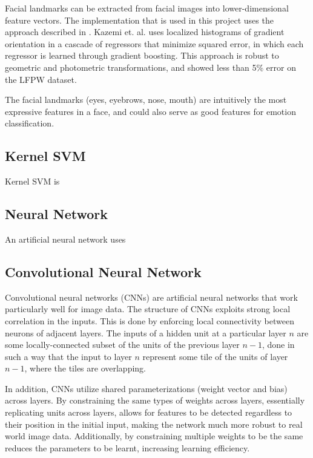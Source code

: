 \documentclass[11pt, twocolumn, twoside]{article}
\begin{document}
Facial landmarks can be extracted from facial images into lower-dimensional feature
vectors. The implementation that is used in this project uses the approach described
in \cite{Kazemi}. Kazemi et. al. uses localized histograms of gradient orientation in
a cascade of regressors that minimize squared error, in which each regressor is learned
through gradient boosting. This approach is robust to geometric and photometric
transformations, and showed less than 5\% error on the LFPW dataset.

The facial landmarks (eyes, eyebrows, nose, mouth) are intuitively the most expressive 
features in a face, and could also serve as good features for emotion classification.

\subsection{Kernel SVM}

Kernel SVM is 

\subsection{Neural Network}

An artificial neural network uses

\subsection{Convolutional Neural Network}

Convolutional neural networks (CNNs) are artificial neural networks that work particularly well for image data. The structure of CNNs exploits strong local correlation in the inputs. This is done by enforcing local connectivity between neurons of adjacent layers. The inputs of a hidden unit at a particular layer $n$ are some locally-connected subset of the units of the previous layer $n-1$, done in such a way that the input to layer $n$ represent some tile of the units of layer $n-1$, where the tiles are overlapping.

In addition, CNNs utilize shared parameterizations (weight vector and bias) across layers. By constraining the same types of weights across layers, essentially replicating units across layers, allows for features to be detected regardless to their position in the initial input, making the network much more robust to real world image data. Additionally, by constraining multiple weights to be the same reduces the parameters to be learnt, increasing learning efficiency.
\end{document}
